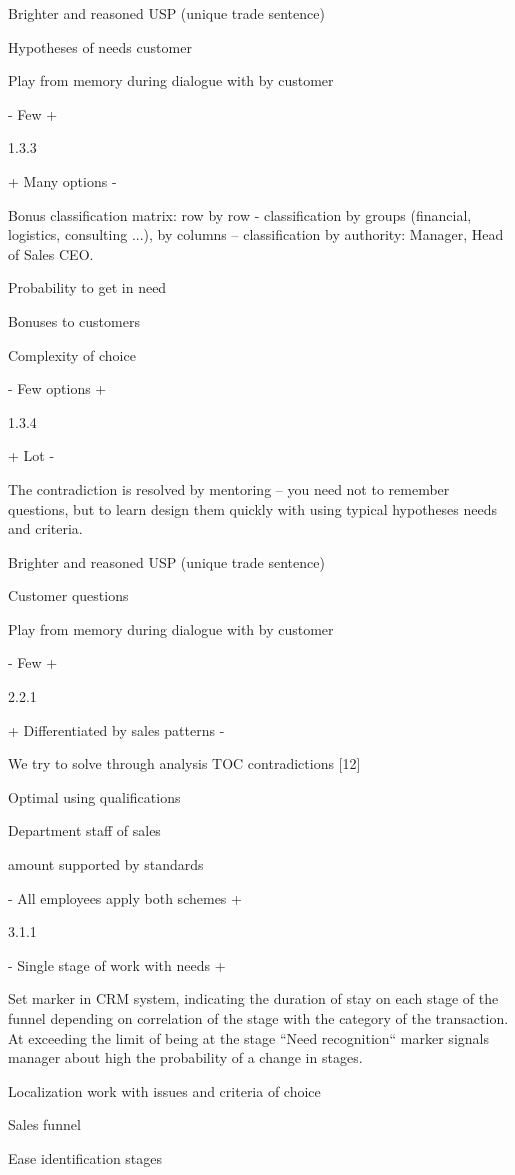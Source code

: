 \documentclass[11pt,a4paper]{book}
\begin{document}
Brighter and reasoned USP (unique trade sentence)

Hypotheses of needs customer

Play from memory during dialogue with by customer

- Few +

1.3.3

+ Many options -

Bonus classification matrix: row by row - classification by groups (financial,
logistics, consulting ...), by columns -- classification by authority:
Manager, Head of Sales CEO.

Probability to get in need

Bonuses to customers

Complexity of choice

- Few options +

1.3.4

+ Lot -

The contradiction is resolved by mentoring -- you need not to remember
questions, but to learn design them quickly with using typical hypotheses
needs and criteria.

Brighter and reasoned USP (unique trade sentence)

Customer questions

Play from memory during dialogue with by customer

- Few +

2.2.1

+ Differentiated by sales patterns -

We try to solve through analysis TOC contradictions [12]

Optimal using qualifications

Department staff of sales

amount supported by standards

- All employees apply both schemes +

3.1.1

- Single stage of work with needs +

Set marker in CRM system, indicating the duration of stay on each stage of the
funnel depending on correlation of the stage with the category of the
transaction. At exceeding the limit of being at the stage “Need recognition“
marker signals manager about high the probability of a change in stages.

Localization work with issues and criteria of choice

Sales funnel

Ease identification stages
\end{document}
